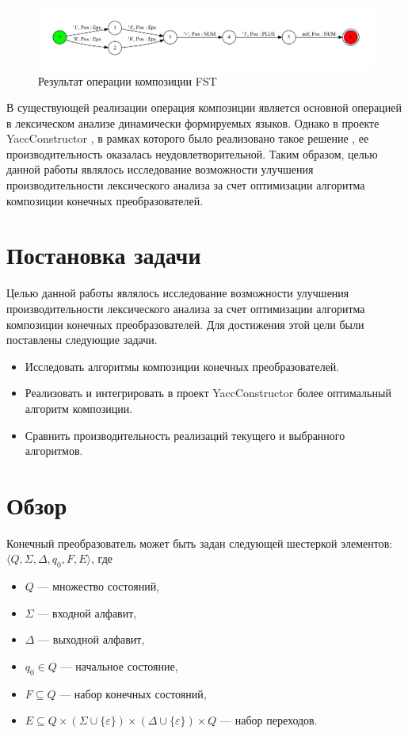 \documentclass[14pt]{matmex-diploma}
\begin{document}
\begin{figure}[h]
\centering
\includegraphics[width=16cm]{pictures/res_.pdf}
\caption{Результат операции композиции FST}
\label{результат_композиции}
\end{figure}

В существующей реализации операция композиции является основной операцией в лексическом анализе динамически формируемых языков. Однако в проекте YaccConstructor \cite{yacc_article,yacc_www}, в рамках которого было реализовано такое решение \cite{polubelova}, ее производительность оказалась неудовлетворительной. Таким образом, целью данной работы являлось исследование возможности улучшения производительности лексического анализа за счет оптимизации алгоритма композиции конечных преобразователей.

\section{Постановка задачи}
Целью данной работы являлось исследование возможности улучшения производительности лексического анализа за счет оптимизации алгоритма композиции конечных преобразователей. Для достижения этой цели были поставлены следующие задачи.

\begin{itemize}
\item Исследовать алгоритмы композиции конечных преобразователей.
\item Реализовать и интегрировать в проект YaccConstructor более оптимальный алгоритм композиции.
\item Сравнить производительность реализаций текущего и выбранного алгоритмов.
\end{itemize} 

\section{Обзор}
Конечный преобразователь может быть задан следующей шестеркой элементов: $\langle Q, \Sigma, \Delta, q_0, F, E \rangle$, где

\begin{itemize}
\item $Q$ — множество состояний, 
\item $\Sigma$ — входной алфавит, 
\item $\Delta$ — выходной алфавит, 
\item $q_0 \in Q$ — начальное состояние, 
\item $F \subseteq Q$ — набор конечных состояний, 
\item $E \subseteq Q \times (\Sigma \cup \{\varepsilon\}) \times (\Delta \cup \{\varepsilon\})  \times Q$ — набор переходов. 
\end{itemize}
\end{document}
